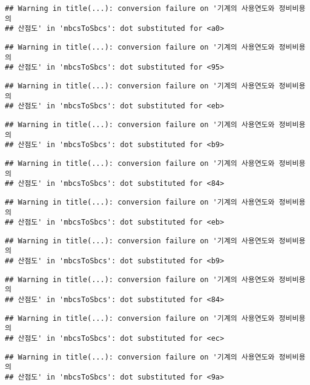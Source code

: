 \documentclass[
]{article}
\begin{document}
\begin{verbatim}
## Warning in title(...): conversion failure on '기계의 사용연도와 정비비용의
## 산점도' in 'mbcsToSbcs': dot substituted for <a0>
\end{verbatim}

\begin{verbatim}
## Warning in title(...): conversion failure on '기계의 사용연도와 정비비용의
## 산점도' in 'mbcsToSbcs': dot substituted for <95>
\end{verbatim}

\begin{verbatim}
## Warning in title(...): conversion failure on '기계의 사용연도와 정비비용의
## 산점도' in 'mbcsToSbcs': dot substituted for <eb>
\end{verbatim}

\begin{verbatim}
## Warning in title(...): conversion failure on '기계의 사용연도와 정비비용의
## 산점도' in 'mbcsToSbcs': dot substituted for <b9>
\end{verbatim}

\begin{verbatim}
## Warning in title(...): conversion failure on '기계의 사용연도와 정비비용의
## 산점도' in 'mbcsToSbcs': dot substituted for <84>
\end{verbatim}

\begin{verbatim}
## Warning in title(...): conversion failure on '기계의 사용연도와 정비비용의
## 산점도' in 'mbcsToSbcs': dot substituted for <eb>
\end{verbatim}

\begin{verbatim}
## Warning in title(...): conversion failure on '기계의 사용연도와 정비비용의
## 산점도' in 'mbcsToSbcs': dot substituted for <b9>
\end{verbatim}

\begin{verbatim}
## Warning in title(...): conversion failure on '기계의 사용연도와 정비비용의
## 산점도' in 'mbcsToSbcs': dot substituted for <84>
\end{verbatim}

\begin{verbatim}
## Warning in title(...): conversion failure on '기계의 사용연도와 정비비용의
## 산점도' in 'mbcsToSbcs': dot substituted for <ec>
\end{verbatim}

\begin{verbatim}
## Warning in title(...): conversion failure on '기계의 사용연도와 정비비용의
## 산점도' in 'mbcsToSbcs': dot substituted for <9a>
\end{verbatim}
\end{document}
